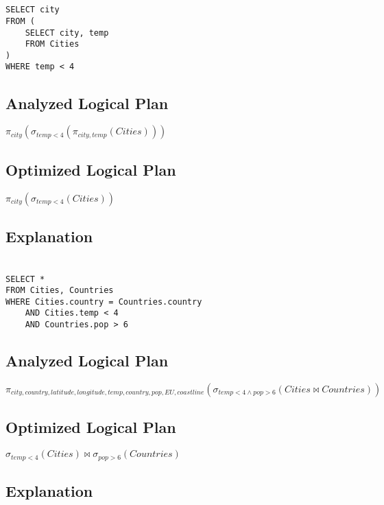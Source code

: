 \documentclass[12pt]{article}
\begin{document}
\newpage

\section{}
\begin{verbatim}
SELECT city
FROM (
    SELECT city, temp
    FROM Cities
)
WHERE temp < 4
\end{verbatim}

\subsection*{Analyzed Logical Plan}
$\pi_{city}(\sigma_{temp<4}(\pi_{city, temp}(Cities)))$

\subsection*{Optimized Logical Plan}
$\pi_{city}(\sigma_{temp<4}(Cities))$

\subsection*{Explanation}

\newpage

\section{}
\begin{verbatim}
SELECT *
FROM Cities, Countries
WHERE Cities.country = Countries.country
    AND Cities.temp < 4
    AND Countries.pop > 6
\end{verbatim}

\subsection*{Analyzed Logical Plan}
$\pi_{city, country, latitude, longitude, temp, country, pop, EU, coastline}(\sigma_{temp<4 \land pop>6}(Cities \Join Countries))$

\subsection*{Optimized Logical Plan}
$\sigma_{temp<4}(Cities) \Join \sigma_{pop>6}(Countries)$

\subsection*{Explanation}
\end{document}
